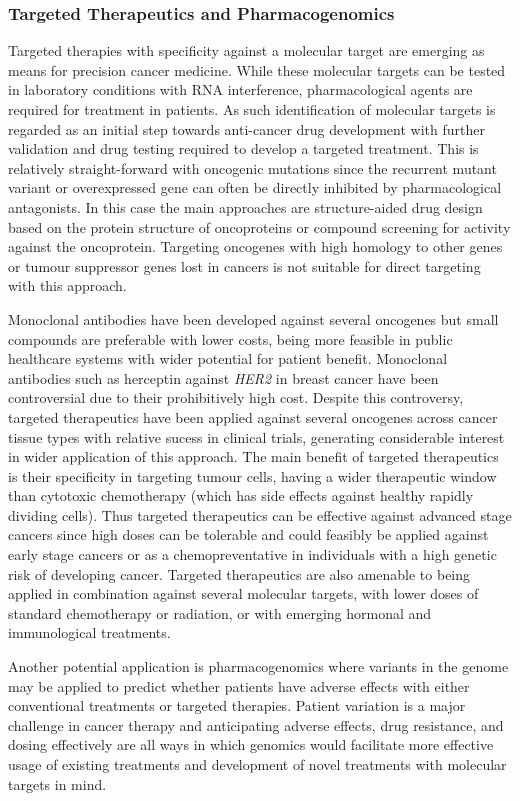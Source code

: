 \subsubsection{Targeted Therapeutics and Pharmacogenomics}
Targeted therapies with specificity against a molecular target are emerging as means for precision cancer medicine. While these molecular targets can be tested in laboratory conditions with RNA interference, pharmacological agents are required for treatment in patients. As such identification of molecular targets is regarded as an initial step towards anti-cancer drug development with further validation and drug testing required to develop a targeted treatment. This is relatively straight-forward with oncogenic mutations since the recurrent mutant variant or overexpressed gene can often be directly inhibited by pharmacological antagonists. In this case the main approaches are structure-aided drug design based on the protein structure of oncoproteins or compound screening for activity against the oncoprotein. Targeting oncogenes with high homology to other genes or tumour suppressor genes lost in cancers is not suitable for direct targeting with this approach.

Monoclonal antibodies have been developed against several oncogenes but small compounds are preferable with lower costs, being more feasible in public healthcare systems with wider potential for patient benefit. Monoclonal antibodies such as herceptin against \textit{HER2} in breast cancer have been controversial due to their prohibitively high cost. Despite this controversy, targeted therapeutics have been applied against several oncogenes across cancer tissue types with relative sucess in clinical trials, generating considerable interest in wider application of this approach. The main benefit of targeted therapeutics is their specificity in targeting tumour cells, having a wider therapeutic window than cytotoxic chemotherapy (which has side effects against healthy rapidly dividing cells). Thus targeted therapeutics can be effective against advanced stage cancers since high doses can be tolerable and could feasibly be applied against early stage cancers or as a chemopreventative in individuals with a high genetic risk of developing cancer. Targeted therapeutics are also amenable to being applied in combination against several molecular targets, with lower doses of standard chemotherapy or radiation, or with emerging hormonal and immunological treatments.

Another potential application is pharmacogenomics where variants in the genome may be applied to predict whether patients have adverse effects with either conventional treatments or targeted therapies. Patient variation is a major challenge in cancer therapy and anticipating adverse effects, drug resistance, and dosing effectively are all ways in which genomics would facilitate more effective usage of existing treatments and development of novel treatments with molecular targets in mind.

